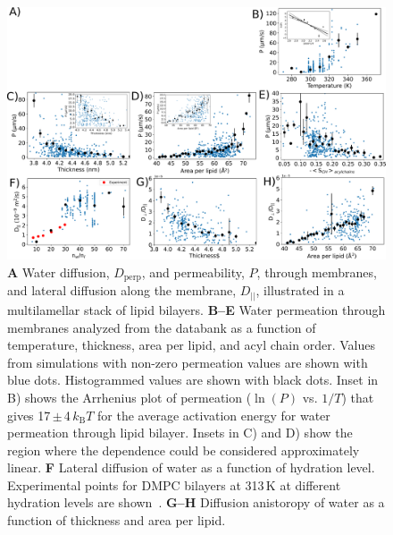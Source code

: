 \documentclass[fleqn,10pt]{wlscirep}
\begin{document}
\begin{figure}[tb]
    \centering
    \includegraphics[width=\linewidth]{Figures/permeation2.pdf}
    \caption{\textbf{A} Water diffusion, $D_\mathrm{perp}$, and permeability, $P$, through membranes, and lateral diffusion along the membrane, $D_{||}$, illustrated in a multilamellar stack of lipid bilayers. 
    \textbf{B--E} Water permeation through membranes analyzed from the databank as a function of temperature, thickness, area per lipid, and acyl chain order. Values from simulations with non-zero permeation values are shown with blue dots. Histogrammed values are shown with black dots. Inset in B) shows the Arrhenius plot of permeation ($\ln(P)$ vs. $1/T$) that gives 17\,$\pm$\,4\,$k_\mathrm{B}T$ for the average activation energy for water permeation through lipid bilayer. Insets in C) and D) show the region where the dependence could be considered approximately linear.
    \textbf{F} Lateral diffusion of water as a function of hydration level. Experimental points for DMPC bilayers at 313\,K at different hydration levels are shown~\cite{rudakova04}.
    \textbf{G--H} Diffusion anistoropy of water as a function of thickness and area per lipid. }
    \label{fig:permeability}
\end{figure}
\end{document}

